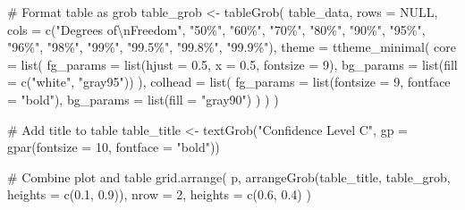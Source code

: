 \documentclass[
  letterpaper,
  DIV=11,
  numbers=noendperiod]{scrreprt}
\newenvironment{Shaded}{\begin{snugshade}}{\end{snugshade}}
\newcommand{\AttributeTok}[1]{\textcolor[rgb]{0.40,0.45,0.13}{#1}}
\newcommand{\CommentTok}[1]{\textcolor[rgb]{0.37,0.37,0.37}{#1}}
\newcommand{\ConstantTok}[1]{\textcolor[rgb]{0.56,0.35,0.01}{#1}}
\newcommand{\DecValTok}[1]{\textcolor[rgb]{0.68,0.00,0.00}{#1}}
\newcommand{\FloatTok}[1]{\textcolor[rgb]{0.68,0.00,0.00}{#1}}
\newcommand{\FunctionTok}[1]{\textcolor[rgb]{0.28,0.35,0.67}{#1}}
\newcommand{\NormalTok}[1]{\textcolor[rgb]{0.00,0.23,0.31}{#1}}
\newcommand{\OtherTok}[1]{\textcolor[rgb]{0.00,0.23,0.31}{#1}}
\newcommand{\SpecialCharTok}[1]{\textcolor[rgb]{0.37,0.37,0.37}{#1}}
\newcommand{\StringTok}[1]{\textcolor[rgb]{0.13,0.47,0.30}{#1}}
\begin{document}
\begin{Shaded}
\begin{Highlighting}[]
\CommentTok{\# Format table as grob}
\NormalTok{table\_grob }\OtherTok{\textless{}{-}} \FunctionTok{tableGrob}\NormalTok{(}
\NormalTok{  table\_data,}
  \AttributeTok{rows =} \ConstantTok{NULL}\NormalTok{,}
  \AttributeTok{cols =} \FunctionTok{c}\NormalTok{(}\StringTok{"Degrees of}\SpecialCharTok{\textbackslash{}n}\StringTok{Freedom"}\NormalTok{, }\StringTok{"50\%"}\NormalTok{, }\StringTok{"60\%"}\NormalTok{, }\StringTok{"70\%"}\NormalTok{, }\StringTok{"80\%"}\NormalTok{, }\StringTok{"90\%"}\NormalTok{, }
           \StringTok{"95\%"}\NormalTok{, }\StringTok{"96\%"}\NormalTok{, }\StringTok{"98\%"}\NormalTok{, }\StringTok{"99\%"}\NormalTok{, }\StringTok{"99.5\%"}\NormalTok{, }\StringTok{"99.8\%"}\NormalTok{, }\StringTok{"99.9\%"}\NormalTok{),}
  \AttributeTok{theme =} \FunctionTok{ttheme\_minimal}\NormalTok{(}
    \AttributeTok{core =} \FunctionTok{list}\NormalTok{(}
      \AttributeTok{fg\_params =} \FunctionTok{list}\NormalTok{(}\AttributeTok{hjust =} \FloatTok{0.5}\NormalTok{, }\AttributeTok{x =} \FloatTok{0.5}\NormalTok{, }\AttributeTok{fontsize =} \DecValTok{9}\NormalTok{),}
      \AttributeTok{bg\_params =} \FunctionTok{list}\NormalTok{(}\AttributeTok{fill =} \FunctionTok{c}\NormalTok{(}\StringTok{"white"}\NormalTok{, }\StringTok{"gray95"}\NormalTok{))}
\NormalTok{    ),}
    \AttributeTok{colhead =} \FunctionTok{list}\NormalTok{(}
      \AttributeTok{fg\_params =} \FunctionTok{list}\NormalTok{(}\AttributeTok{fontsize =} \DecValTok{9}\NormalTok{, }\AttributeTok{fontface =} \StringTok{"bold"}\NormalTok{),}
      \AttributeTok{bg\_params =} \FunctionTok{list}\NormalTok{(}\AttributeTok{fill =} \StringTok{"gray90"}\NormalTok{)}
\NormalTok{    )}
\NormalTok{  )}
\NormalTok{)}

\CommentTok{\# Add title to table}
\NormalTok{table\_title }\OtherTok{\textless{}{-}} \FunctionTok{textGrob}\NormalTok{(}\StringTok{"Confidence Level C"}\NormalTok{, }
                       \AttributeTok{gp =} \FunctionTok{gpar}\NormalTok{(}\AttributeTok{fontsize =} \DecValTok{10}\NormalTok{, }\AttributeTok{fontface =} \StringTok{"bold"}\NormalTok{))}

\CommentTok{\# Combine plot and table}
\FunctionTok{grid.arrange}\NormalTok{(}
\NormalTok{  p,}
  \FunctionTok{arrangeGrob}\NormalTok{(table\_title, table\_grob, }\AttributeTok{heights =} \FunctionTok{c}\NormalTok{(}\FloatTok{0.1}\NormalTok{, }\FloatTok{0.9}\NormalTok{)),}
  \AttributeTok{nrow =} \DecValTok{2}\NormalTok{,}
  \AttributeTok{heights =} \FunctionTok{c}\NormalTok{(}\FloatTok{0.6}\NormalTok{, }\FloatTok{0.4}\NormalTok{)}
\NormalTok{)}
\end{Highlighting}
\end{Shaded}
\end{document}
